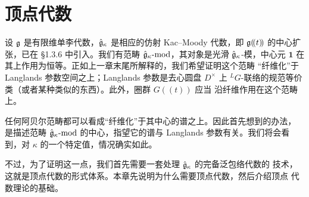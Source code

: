 %
%
\begingroup

\chapter{顶点代数}

设 $\mathfrak{g}$ 是有限维单李代数，$\hat{\mathfrak{g}}_\kappa$ 是相应的仿射 Kac--Moody 代数，即
$\mathfrak{g}(\!(t)\!)$ 的中心扩张，已在 \S1.3.6 中引入。我们有范畴
$\hat{\mathfrak{g}}_\kappa\text{-}\mathrm{mod}$，其对象是光滑 $\hat{\mathfrak{g}}_\kappa$-模，中心元
$\mathbf{1}$ 在其上作用为恒等。正如上一章末尾所解释的，我们希望证明这个范畴
“纤维化”于 Langlands 参数空间之上；Langlands 参数是去心圆盘 $D^\times$ 上
${}^LG$-联络的规范等价类（或者某种类似的东西）。此外，圈群 $G(\!(t)\!)$ 应当
沿纤维作用在这个范畴上。

任何阿贝尔范畴都可以看成“纤维化”于其中心的谱之上。因此首先想到的办法，
是描述范畴 $\hat{\mathfrak{g}}_\kappa\text{-}\mathrm{mod}$ 的中心，指望它的谱与 Langlands
参数有关。我们将会看到，对 $\kappa$ 的一个特定值，情况确实如此。

不过，为了证明这一点，我们首先需要一套处理 $\hat{\mathfrak{g}}_\kappa$ 的完备泛包络代数的
技术，这就是顶点代数的形式体系。本章先说明为什么需要顶点代数，然后介绍顶点
代数理论的基础。

